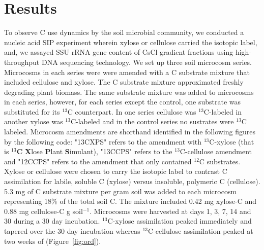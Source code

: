 \section{Results}
To observe C use dynamics by the soil microbial community, we conducted a
nucleic acid SIP experiment wherein xylose or cellulose carried the isotopic
label, and, we assayed SSU rRNA gene content of CsCl gradient fractions using
high-throughput DNA sequencing technology. We set up three soil microcosm series. 
Microcosms in each series were were amended with a C substrate mixture
that included cellulose and xylose. The C substrate mixture approximated
freshly degrading plant biomass. The same substrate mixture was added to microcosms
in each series, however, for each series except the control, one substrate
was substituted for its $^{13}$C counterpart. In one series cellulose was
$^{13}$C-labeled in another xylose was $^{13}$C-labeled and in the control
series no sustrates were $^{13}$C labeled. Microcosm amendments are shorthand identified
in the following figures by the following code: "13CXPS" refers to the
amendment with $^{13}$C-xylose (that is $^{13}$\textbf{C} \textbf{X}lose
\textbf{P}lant \textbf{S}imulant), "13CCPS" refers to the $^{13}$C-cellulose
amendment and "12CCPS" refers to the amendment that only contained $^{12}$C
substrates. Xylose or cellulose were chosen to carry the isotopic label to
contrast C assimilation for labile, soluble C (xylose) versus
insoluble, polymeric C (cellulose).  5.3 mg of C substrate mixture per gram
soil was added to each microcosm representing 18\% of the total soil C. The
mixture included 0.42 mg xylose-C and 0.88 mg cellulose-C g soil$^{-1}$.
Microcosms were harvested at days 1, 3, 7, 14 and 30  during a 30 day
incubation. $^{13}$C-xylose assimilation peaked immediately and tapered
over the 30 day incubation whereas $^{13}$C-cellulose assimilation peaked at
two weeks of (Figure~\ref{fig:ord}).
